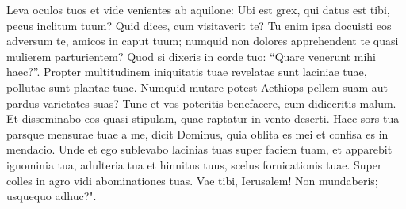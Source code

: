 \begin{biblechapter}
\verse Leva oculos tuos et vide venientes ab aquilone: Ubi est grex, qui datus est tibi, pecus inclitum tuum? 
\verse Quid dices, cum visitaverit te? Tu enim ipsa docuisti eos adversum te, amicos in caput tuum; numquid non dolores apprehendent te quasi mulierem parturientem? 
\verse Quod si dixeris in corde tuo: “Quare venerunt mihi haec?”. Propter multitudinem iniquitatis tuae revelatae sunt laciniae tuae, pollutae sunt plantae tuae. 
\verse Numquid mutare potest Aethiops pellem suam aut pardus varietates suas? Tunc et vos poteritis benefacere, cum didiceritis malum. 
\verse Et disseminabo eos quasi stipulam, quae raptatur in vento deserti. 
\verse Haec sors tua parsque mensurae tuae a me, dicit Dominus, quia oblita es mei et confisa es in mendacio. 
\verse Unde et ego sublevabo lacinias tuas super faciem tuam, et apparebit ignominia tua, 
\verse adulteria tua et hinnitus tuus, scelus fornicationis tuae. Super colles in agro vidi abominationes tuas. Vae tibi, Ierusalem! Non mundaberis; usquequo adhuc?". 
\end{biblechapter}

